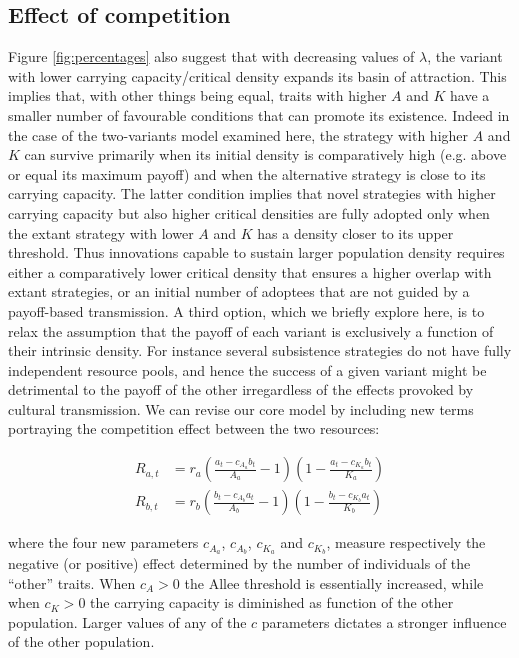 \documentclass[3p,authoryear,twocolumn]{elsarticle} %
\begin{document}
\subsection{Effect of competition}

Figure \ref{fig:percentages} also suggest that with decreasing values of $\lambda$, the variant with lower carrying capacity/critical density expands its basin of attraction. This implies that, with other things being equal, traits with higher $A$ and $K$ have a smaller number of favourable conditions that can promote its existence. Indeed in the case of the two-variants model examined here, the strategy with higher $A$ and $K$ can survive primarily when its initial density is comparatively high (e.g. above or equal its maximum payoff) and when the alternative strategy is close to its carrying capacity. The latter condition implies that novel strategies with higher carrying capacity but also higher critical densities are fully adopted only when the extant strategy with lower $A$ and $K$ has a density closer to its upper threshold. Thus innovations capable to sustain larger population density requires either a comparatively lower critical density that ensures a higher overlap with extant strategies, or an initial number of adoptees that are not guided by a payoff-based transmission. A third option, which we briefly explore here, is to relax the assumption that the payoff of each variant is exclusively a function of their intrinsic density. For instance several subsistence strategies do not have fully independent resource pools, and hence the success of a given variant might be detrimental to the payoff of the other irregardless of the effects provoked by cultural transmission. We can revise our core model by including new terms portraying the competition effect between the two resources:  

\begin{equation}
\begin{aligned}
R_{a,t}& = r_a (\frac{a_t-c_{A_a}b_t}{A_a}-1)(1-\frac{a_t-c_{K_a}b_t}{K_a})\\
R_{b,t}& = r_b (\frac{b_t-c_{A_b}a_t}{A_b}-1)(1-\frac{b_t-c_{K_b}a_t}{K_b}) 
\label{eqCompetition}
\end{aligned}
\end{equation}

where the four new parameters $c_{A_a}$, $c_{A_b}$, $c_{K_a}$ and $c_{K_b}$, measure respectively the negative (or positive) effect determined by the number of individuals of the “other” traits. When $c_{A}>0$ the Allee threshold is essentially increased, while when $c_{K}>0$ the carrying capacity is diminished as function of the other population. Larger values of any of the $c$ parameters dictates a stronger influence of the other population. 
\end{document}
